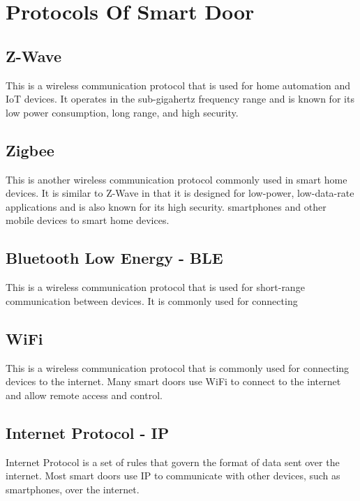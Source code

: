 \documentclass{article}
\begin{document}
\section{Protocols Of Smart Door}
\subsection{Z-Wave}
This is a wireless communication protocol that is used for home automation and IoT devices. It operates in the sub-gigahertz frequency range and is known for its low power consumption, long range, and high security.

\subsection{Zigbee}
This is another wireless communication protocol commonly used in smart home devices. It is similar to Z-Wave in that it is designed for low-power, low-data-rate applications and is also known for its high security. smartphones and other mobile devices to smart home devices.

\subsection{Bluetooth Low Energy - BLE}
This is a wireless communication protocol that is used for short-range communication between devices. It is commonly used for connecting 

\subsection{WiFi}
This is a wireless communication protocol that is commonly used for connecting devices to the internet. Many smart doors use WiFi to connect to the internet and allow remote access and control.

\subsection{Internet Protocol - IP}
Internet Protocol is a set of rules that govern the format of data sent over the internet. Most smart doors use IP to communicate with other devices, such as smartphones, over the internet.
\end{document}

